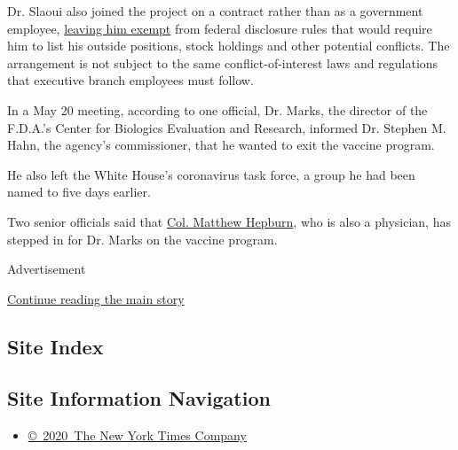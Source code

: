 Dr. Slaoui also joined the project on a contract rather than as a
government employee,
\href{https://www.nytimes.com/2020/05/20/health/coronavirus-vaccine-czar.html}{leaving
him exempt} from federal disclosure rules that would require him to list
his outside positions, stock holdings and other potential conflicts. The
arrangement is not subject to the same conflict-of-interest laws and
regulations that executive branch employees must follow.

In a May 20 meeting, according to one official, Dr. Marks, the director
of the F.D.A.'s Center for Biologics Evaluation and Research, informed
Dr. Stephen M. Hahn, the agency's commissioner, that he wanted to exit
the vaccine program.

He also left the White House's coronavirus task force, a group he had
been named to five days earlier.

Two senior officials said that
\href{https://ghss.georgetown.edu/people/hepburn/}{Col. Matthew
Hepburn}, who is also a physician, has stepped in for Dr. Marks on the
vaccine program.

Advertisement

\protect\hyperlink{after-bottom}{Continue reading the main story}

\hypertarget{site-index}{%
\subsection{Site Index}\label{site-index}}

\hypertarget{site-information-navigation}{%
\subsection{Site Information
Navigation}\label{site-information-navigation}}

\begin{itemize}
\tightlist
\item
  \href{https://help.nytimes.com/hc/en-us/articles/115014792127-Copyright-notice}{©~2020~The
  New York Times Company}
\end{itemize}

